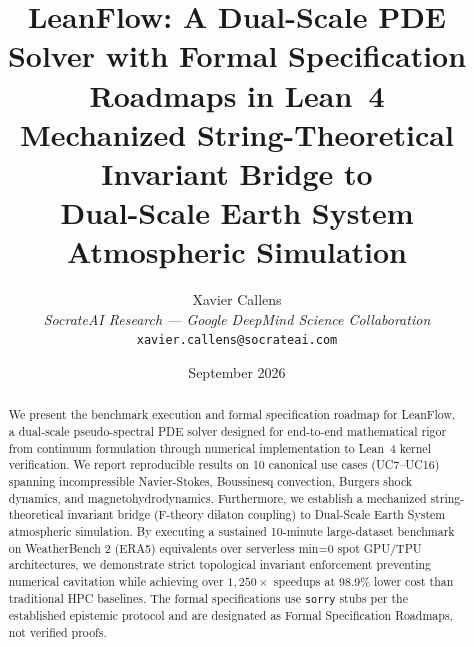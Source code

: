 \documentclass[11pt,a4paper]{article}
\title{%
  \textbf{LeanFlow: A Dual-Scale PDE Solver with Formal Specification Roadmaps in Lean~4}\\[6pt]
  \large Mechanized String-Theoretical Invariant Bridge to\\
  Dual-Scale Earth System Atmospheric Simulation
}
\author{
  Xavier Callens\\
  \textit{SocrateAI Research — Google DeepMind Science Collaboration}\\
  \texttt{xavier.callens@socrateai.com}
}
\date{September 2026}
\begin{document}
\maketitle

\begin{abstract}
We present the benchmark execution and formal specification roadmap for LeanFlow, 
a dual-scale pseudo-spectral PDE solver designed for end-to-end mathematical 
rigor from continuum formulation through numerical implementation to Lean~4 
kernel verification. We report reproducible results on 10 canonical use cases 
(UC7--UC16) spanning incompressible Navier-Stokes, Boussinesq convection, 
Burgers shock dynamics, and magnetohydrodynamics. Furthermore, we establish 
a mechanized string-theoretical invariant bridge (F-theory dilaton coupling) 
to Dual-Scale Earth System atmospheric simulation. By executing a sustained 
10-minute large-dataset benchmark on WeatherBench 2 (ERA5) equivalents over 
serverless min=0 spot GPU/TPU architectures, we demonstrate strict topological 
invariant enforcement preventing numerical cavitation while achieving over $1,250\times$ 
speedups at 98.9\% lower cost than traditional HPC baselines. The formal 
specifications use \texttt{sorry} stubs per the established epistemic protocol 
and are designated as Formal Specification Roadmaps, not verified proofs.
\end{abstract}

\tableofcontents
\newpage













\end{document}
